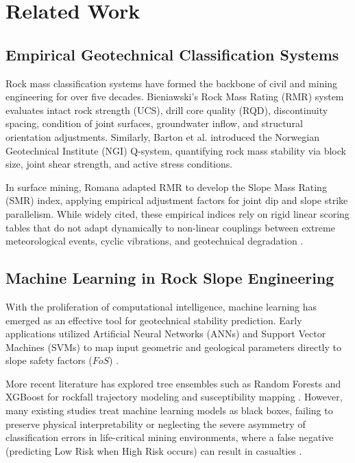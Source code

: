 \documentclass[conference]{IEEEtran}
\begin{document}
\section{Related Work}

\subsection{Empirical Geotechnical Classification Systems}
Rock mass classification systems have formed the backbone of civil and mining engineering for over five decades. Bieniawski's Rock Mass Rating (RMR) system \cite{bieniawski1989engineering} evaluates intact rock strength (UCS), drill core quality (RQD), discontinuity spacing, condition of joint surfaces, groundwater inflow, and structural orientation adjustments. Similarly, Barton et al. \cite{barton1974engineering} introduced the Norwegian Geotechnical Institute (NGI) Q-system, quantifying rock mass stability via block size, joint shear strength, and active stress conditions. 

In surface mining, Romana \cite{romana1985slope} adapted RMR to develop the Slope Mass Rating (SMR) index, applying empirical adjustment factors for joint dip and slope strike parallelism. While widely cited, these empirical indices rely on rigid linear scoring tables that do not adapt dynamically to non-linear couplings between extreme meteorological events, cyclic vibrations, and geotechnical degradation \cite{hoek1981rock}.

\subsection{Machine Learning in Rock Slope Engineering}
With the proliferation of computational intelligence, machine learning has emerged as an effective tool for geotechnical stability prediction. Early applications utilized Artificial Neural Networks (ANNs) and Support Vector Machines (SVMs) to map input geometric and geological parameters directly to slope safety factors ($FoS$) \cite{sakellariou2005slope, manouchehrian2014application}. 

More recent literature has explored tree ensembles such as Random Forests and XGBoost for rockfall trajectory modeling and susceptibility mapping \cite{merghadi2020machine, yosef2022application}. However, many existing studies treat machine learning models as black boxes, failing to preserve physical interpretability or neglecting the severe asymmetry of classification errors in life-critical mining environments, where a false negative (predicting Low Risk when High Risk occurs) can result in casualties \cite{guo2017calibration}.
\end{document}
